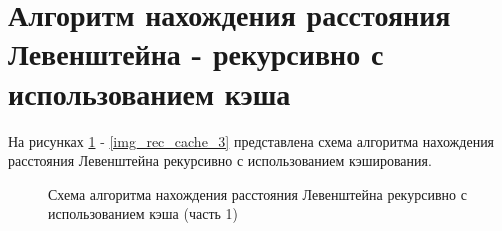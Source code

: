 \section{Алгоритм нахождения расстояния Левенштейна - рекурсивно с использованием кэша}
На рисунках \ref{img_rec_cache_1} - \ref{img_rec_cache_3} представлена схема алгоритма нахождения расстояния Левенштейна рекурсивно с использованием кэширования.

\begin{figure}[p]
	\caption{Схема алгоритма нахождения расстояния Левенштейна рекурсивно с использованием кэша (часть 1)}
	\label{img_rec_cache_1}
\end{figure}
